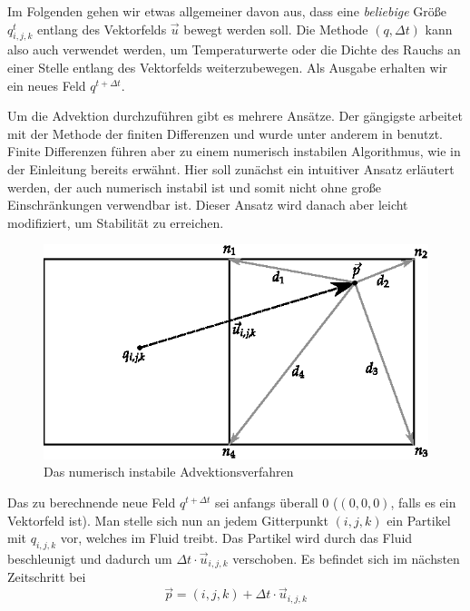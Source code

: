 Im Folgenden gehen wir etwas allgemeiner davon aus, dass eine
\emph{beliebige} Größe $q_{i,j,k}^{t}$ entlang des Vektorfelds
$\vec{u}$ bewegt werden soll. Die Methode
$(q,\Delta t)$ kann also auch verwendet
werden, um Temperaturwerte oder die Dichte des Rauchs an einer Stelle
entlang des Vektorfelds weiterzubewegen. Als Ausgabe erhalten wir ein
neues Feld $q^{t+\Delta t}$.

Um die Advektion durchzuführen gibt es mehrere Ansätze. Der gängigste arbeitet
mit der Methode der finiten Differenzen und wurde unter anderem in
\cite{Foster} benutzt. Finite Differenzen führen aber zu einem numerisch
instabilen Algorithmus, wie in der Einleitung bereits erwähnt. Hier
soll zunächst ein intuitiver Ansatz erläutert werden, der auch
numerisch instabil ist und somit nicht ohne große Einschränkungen
verwendbar ist. Dieser Ansatz wird danach aber leicht modifiziert, um
Stabilität zu erreichen.

\begin{figure}[h]
\centering
%
\includegraphics[width=12cm]{images/advection_bad}
\caption{Das numerisch instabile Advektionsverfahren}
\label{fig:stam_numerically_unstable_advection}
\end{figure}

Das zu berechnende neue Feld $q^{t+\Delta t}$ sei anfangs
überall 0 (\Pimiddybzw $(0,0,0)$, falls es ein Vektorfeld ist). Man stelle
sich nun an jedem Gitterpunkt $(i,j,k)$ ein Partikel mit
 $q_{i,j,k}$ vor, welches im Fluid treibt. Das
Partikel wird durch das Fluid beschleunigt und dadurch um $\Delta t
\cdot \vec{u}_{i,j,k}$ verschoben. Es befindet sich im nächsten
Zeitschritt bei
\begin{equation}
\vec{p}=(i,j,k)+\Delta t \cdot \vec{u}_{i,j,k}
\end{equation}

